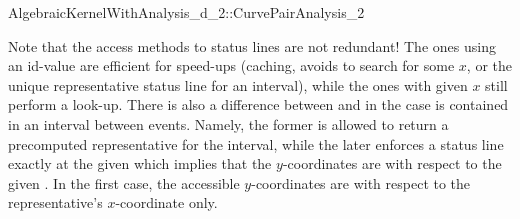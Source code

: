 \begin{ccRefConcept}{AlgebraicKernelWithAnalysis_d_2::CurvePairAnalysis_2}

Note that the access methods to status lines are not redundant! The ones
using an id-value are efficient for speed-ups (caching, avoids to search for
some $x$, or the unique representative status line for an interval),
while the ones with given $x$ still perform a look-up. There is also a 
difference between  and 
 in the case  is contained 
in an interval between events. Namely, the former is allowed to return a
precomputed representative for the interval, while the later enforces
a status line exactly at the given  which implies that the 
$y$-coordinates are with respect to the given . In the first case,
the accessible $y$-coordinates are with respect to the representative's 
$x$-coordinate only.


%
%
%




%

\end{ccRefConcept}
